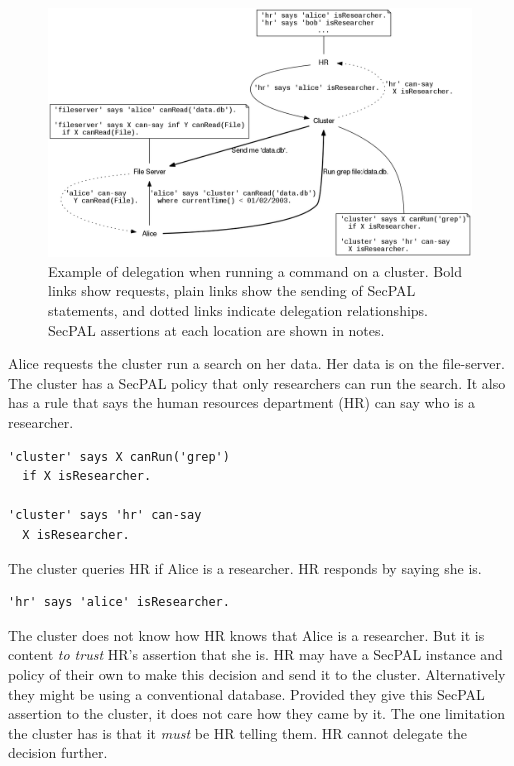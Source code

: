 \documentclass[thesis.tex]{subfiles}
\begin{document}
\begin{figure}
  \centering
  \includegraphics[width=\textwidth]{figures/secpal-example.png}
  \caption[Example of delegation on a cluster.]{Example of delegation when running a command on a cluster.  Bold links show requests, plain links show the sending of SecPAL statements, and dotted links indicate delegation relationships.  SecPAL assertions at each location are shown in notes.}
  \label{fig:delegation-example}
\end{figure}

Alice requests the cluster run a search on her data.  Her data is on the file-server.
The cluster has a SecPAL policy that only researchers can run the search.
It also has a rule that says the human resources department (HR) can say who is a researcher.
\begin{lstlisting}
'cluster' says X canRun('grep')
  if X isResearcher.

'cluster' says 'hr' can-say
  X isResearcher.
\end{lstlisting}
The cluster queries HR if Alice is a researcher. HR responds by saying she is.
\begin{lstlisting}
'hr' says 'alice' isResearcher.
\end{lstlisting}
The cluster does not know how HR knows that Alice is a researcher. But it
is content \emph{to trust} HR's assertion that she is.  HR may have a SecPAL
instance and policy of their own to make this decision and send it to the
cluster. Alternatively they might be using a conventional database.  Provided
they give this SecPAL assertion to the cluster, it does not care
how they came by it.  The one limitation the cluster has is that it
\emph{must} be HR telling them. HR cannot delegate the decision
further.
\end{document}
